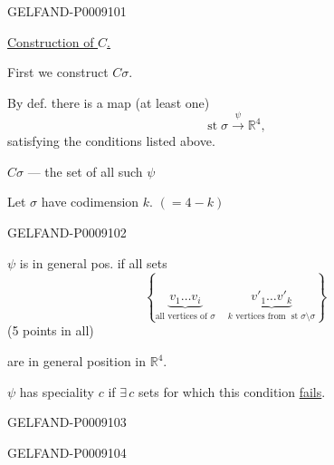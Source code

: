 \begin{GelfandAdjacentEvidence}{GELFAND-P000910}{1}

\uline{Construction of \(C\).}

First we construct $C\sigma$.

By def. there is a map (at least one)
\begin{equation*}
\operatorname{st}\sigma\overset{\psi}{\longrightarrow}\mathbb R^4,
\tag{7}
\end{equation*}
satisfying the conditions listed above.

$C\sigma$ --- the set of all such $\psi$

Let $\sigma$ have codimension $k$. $(=4-k)$
\end{GelfandAdjacentEvidence}
\begin{GelfandAdjacentEvidence}{GELFAND-P000910}{2}


$\psi$ is in general pos. if all sets
\begin{equation*}
\left\{
\underbrace{v_1\ldots v_i}_{\text{all vertices of }\sigma}
\quad
\underbrace{v'_1\ldots v'_k}_{k\text{ vertices from }\operatorname{st}\sigma\setminus\sigma}
\right\}
\tag{8}
\end{equation*}
(5 points in all)

are in general position in $\mathbb R^4$.

$\psi$ has speciality $c$ if $\exists\,c$ sets for which this condition \uline{fails}.
\end{GelfandAdjacentEvidence}
\begin{GelfandAdjacentEvidence}{GELFAND-P000910}{3}

\end{GelfandAdjacentEvidence}
\begin{GelfandAdjacentEvidence}{GELFAND-P000910}{4}

\end{GelfandAdjacentEvidence}
